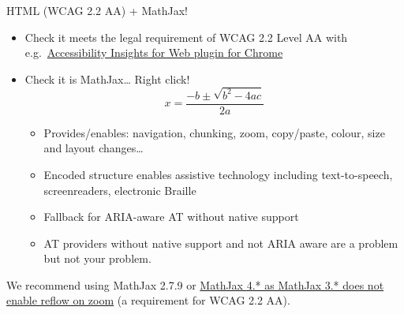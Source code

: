 \documentclass[
  ignorenonframetext,
]{beamer}
\providecommand{\tightlist}{%
  \setlength{\itemsep}{0pt}\setlength{\parskip}{0pt}}
\begin{document}
\begin{frame}{HTML (WCAG 2.2 AA) + MathJax!}
\label{html-wcag-2.2-aa-mathjax}
\begin{itemize}
\item
  Check it meets the legal requirement of WCAG 2.2 Level AA with
  e.g.~\href{https://accessibilityinsights.io/docs/en/web/overview}{Accessibility
  Insights for Web plugin for Chrome}
\item
  Check it is MathJax\ldots{} Right click!
  \[x = \frac{-b\pm\sqrt{b^2 - 4ac}}{2a}\]

  \begin{itemize}
  \tightlist
  \item
    Provides/enables: navigation, chunking, zoom, copy/paste, colour,
    size and layout changes\ldots{}
  \item
    Encoded structure enables assistive technology including
    text-to-speech, screenreaders, electronic Braille
  \item
    Fallback for ARIA-aware AT without native support
  \item
    AT providers without native support and not ARIA aware are a problem
    but not your problem.
  \end{itemize}
\end{itemize}

We recommend using MathJax 2.7.9 or
\href{https://docs.mathjax.org/en/v4.0/output/linebreaks.html}{MathJax
4.* as MathJax 3.* does not enable reflow on zoom} (a requirement for
WCAG 2.2 AA).
\end{frame}
\end{document}
